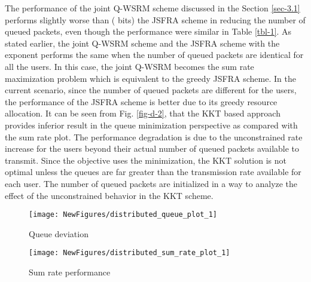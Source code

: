 The performance of the joint \ac{Q-WSRM} scheme discussed in the Section \ref{sec-3.1} performs slightly worse than ( bits) the \ac{JSFRA} scheme in reducing the number of queued packets, even though the performance were similar in Table \ref{tbl-1}. As stated earlier, the joint \ac{Q-WSRM} scheme and the \ac{JSFRA} scheme with the exponent  performs the same when the number of queued packets are identical for all the users. In this case, the joint \ac{Q-WSRM} becomes the sum rate maximization problem which is equivalent to the greedy  \ac{JSFRA} scheme. In the current scenario, since the number of queued packets are different for the users, the performance of the \ac{JSFRA} scheme is better due to its greedy resource allocation. It can be seen from Fig. \ref{fig-d-2}, that the \ac{KKT} based approach provides inferior result in the queue minimization perspective as compared with the sum rate plot. The performance degradation is due to the unconstrained rate increase for the users beyond their actual number of queued packets available to transmit. Since the objective uses the  minimization, the \ac{KKT} solution is not optimal unless the queues are far greater than the transmission rate available for each user. The number of queued packets are initialized in a way to analyze the effect of the unconstrained behavior in the \ac{KKT} scheme.
\begin{figure*}
\centering
\begin{subfigure}{0.49\textwidth}
\texttt{[image: NewFigures/distributed\_queue\_plot\_1]}
\caption{Queue deviation}
\end{subfigure}
\hfill
\begin{subfigure}{0.49\textwidth}
\texttt{[image: NewFigures/distributed\_sum\_rate\_plot\_1]}
\caption{Sum rate performance}
\end{subfigure}
\caption{Convergence plot for  model}
\label{fig-d-2}
\end{figure*}

